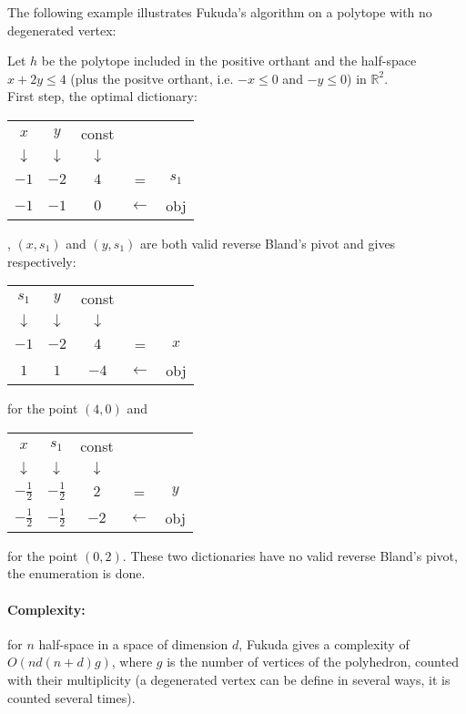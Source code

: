 The following example illustrates Fukuda's algorithm on a polytope with no degenerated vertex:

\begin{example}
	Let $h$ be the polytope included in the positive orthant and the half-space $x+2y\leq 4$ (plus the positve orthant, i.e. $-x\leq 0$ and $-y\leq 0$) in $\mathbb{R}^2$.\\
	First step, the optimal dictionary:
	\begin{tabular}{| c | c || c || c c |}
	\hline	
	$x$ & $y$ & const & & \\
	$\downarrow$ &$\downarrow$ &$\downarrow$ & & \\
	\hline
	\hline	
   	$-1$ & $-2$ & $4$ & = & $s_1$\\ \hline \hline	
   	$-1$ & $-1$ & $0$ & $\leftarrow$ & obj \\
   	\hline	
 	\end{tabular}, 
 	$(x,s_1)$ and $(y,s_1)$ are both valid reverse Bland's pivot and gives respectively:
 	\begin{tabular}{| c | c || c || c c |}
	\hline	
	$s_1$ & $y$ & const & & \\
	$\downarrow$ &$\downarrow$ &$\downarrow$ & & \\
	\hline
	\hline	
   	$-1$ & $-2$ & $4$ & = & $x$\\ \hline \hline	
   	$1$ & $1$ & $-4$ & $\leftarrow$ & obj \\
   	\hline	
 	\end{tabular}
 	for the point $(4,0)$ and
 	\begin{tabular}{| c | c || c || c c |}
	\hline	
	$x$ & $s_1$ & const & & \\
	$\downarrow$ &$\downarrow$ &$\downarrow$ & & \\
	\hline
	\hline	
   	$-\frac{1}{2}$ & $-\frac{1}{2}$ & $2$ & = & $y$\\ \hline \hline	
   	$-\frac{1}{2}$ & $-\frac{1}{2}$ & $-2$ & $\leftarrow$ & obj \\
   	\hline	
 	\end{tabular}
 	for the point $(0,2)$. These two dictionaries have no valid reverse Bland's pivot, the enumeration is done.
	\label{example-fukuda}
\end{example}

\paragraph{Complexity:} for $n$ half-space in a space of dimension $d$, Fukuda gives a complexity of $O(nd(n+d)g)$, where $g$ is the number of vertices of the polyhedron, counted with their multiplicity (a degenerated vertex can be define in several ways, it is counted several times). 